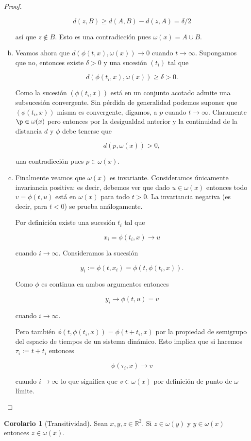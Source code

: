 \documentclass[11pt]{book}
\theoremstyle{definition}
\numberwithin{definition}{section}
\theoremstyle{theorem}
\newtheorem{corollary}{Corolario}
\numberwithin{theorem}{section}
\numberwithin{lemma}{section}
\numberwithin{corollary}{section}
\theoremstyle{plain}
\numberwithin{example}{section}
\newcommand{\R}{{\ensuremath{\mathbb{R}}}}
\begin{document}
\begin{proof}
\begin{enumerate}[(a)]
$$ d(z,B) \geq d(A,B) - d(z,A) = \delta/2$$

así que $z \notin B$. Esto es una contradicción pues $\omega(x) = A \cup B$.

\item Veamos ahora que $d(\phi(t,x), \omega(x)) \to 0$ cuando $t \to \infty$. Supongamos que no, entonces existe $\delta > 0$ y una sucesión $(t_i)$ tal que 

$$ d(\phi(t_i, x), \omega(x)) \geq \delta > 0.$$

Como la sucesión $(\phi(t_i, x))$ está en un conjunto acotado admite una subsucesión convergente. Sin pérdida de generalidad podemos suponer que $(\phi(t_i, x))$ misma es convergente, digamos, a $p$ cuando $t \to \infty$. Claramente $\p \in \omega(x)$ pero entonces por la desigualdad anterior y la continuidad de la distancia $d$ y $\phi$ debe tenerse que

$$ d(p, \omega(x)) > 0,$$

una contradicción pues $p \in \omega(x)$.

\item Finalmente veamos que $\omega(x)$ es invariante. Consideramos únicamente invariancia positiva: es decir, debemos ver que dado $u \in \omega(x)$ entonces todo $v = \phi(t, u)$ está en $\omega(x)$ para todo $t > 0$. La invariancia negativa (es decir, para $t < 0$) se prueba análogamente.

Por definición existe una sucesión $t_i$ tal que

$$ x_i = \phi(t_i, x) \to u$$

cuando $i \to \infty$. Consideramos la sucesión

$$ y_i := \phi(t, x_i) = \phi(t, \phi(t_i, x)).$$

Como $\phi$ es continua en ambos argumentos entonces

$$ y_i \to \phi(t, u) = v$$

cuando $i \to \infty$.

Pero también $ \phi(t, \phi(t_i, x)) = \phi(t + t_i, x) $ por la propiedad de semigrupo del espacio de tiempos de un sistema dinámico. Esto implica que si hacemos $\tau_i := t + t_i$ entonces

$$ \phi(\tau_i, x) \to v$$

cuando $i \to \infty$ lo que significa que $v \in \omega(x)$ por definición de punto de $\omega$-límite.
\end{enumerate}
\end{proof}

\begin{corollary}[Transitividad] Sean $x,y,z \in \R^2$. Si $z \in \omega(y)$ y $y \in \omega(x)$ entonces $z \in \omega(x)$.
\end{corollary}
\end{document}
